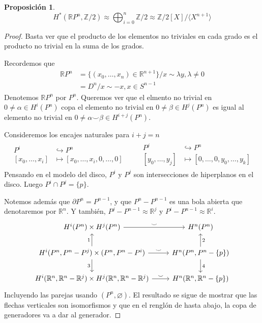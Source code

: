 \documentclass[spanish]{book}
\theoremstyle{definition}
\newtheorem*{prop}{Proposición}
\newcommand{\R}{\mathbb{R}}
\newcommand{\Z}{\mathbb{Z}}
\begin{document}
\begin{prop}
		\[H^*(\R P^n,\Z/2)\approx\bigoplus_{i=0}^n\Z/2\approx\Z/2[X]/\langle X^{n+1}\rangle\]
\end{prop}
\begin{proof}
	Basta ver que el producto de los elementos no triviales en cada grado es el producto no trivial en la suma de los grados.
	
	Recordemos que
	\begin{align*}
		\R P^n&=\{(x_0,\ldots,x_n)\in\R^{n+1}\}\Big/x\sim \lambda y,\lambda\neq0\\
		&=D^n\Big/x\sim -x, x\in S^{n-1}
	\end{align*}
	Denotemos $\R P^n$ por $P^n$. Queremos ver que el elmento no trivial en $0\neq\alpha\in H^i(P^n)$ copa el elemento no trivial en $0\neq\beta\in H^j(P^n)$ es igual al elemento no trivial en ${0\neq\alpha\smile\beta\in H^{i+j}(P^n)}$.
	
	Consideremos los encajes naturales para $i+j=n$
	\begin{align*}
		\begin{aligned}
			P^i&\hookrightarrow P^n\\
		[x_0,\ldots,x_i]&\mapsto[x_0,\ldots,x_i,0,\ldots,0]
		\end{aligned}\qquad
		\begin{aligned}
			P^j&\hookrightarrow P^n\\
			[y_0,\ldots,y_j]&\mapsto[0,\ldots,0,y_0,\ldots,y_k]
		\end{aligned}
	\end{align*}
	Pensando en el modelo del disco, $P^i$ y $P^j$ son intersecciones de hiperplanos en el disco. Luego $P^i\cap P^j=\{p\}$.
	
	Notemos además que $\partial P^n=P^{n-1}$, y que $P^n-P^{n-1}$ es una bola abierta que denotaremos por $\R^n$. Y también, $P^j-P^{n-1}\approx\R^j$ y $P^i-P^{n-1}\approx\R^i$.
	\[\begin{tikzcd}
		H^i(P^n)\times H^j(P^n)\arrow[r,"\smile"]&H^n(P^n)\\
		H^i(P^n,P^n-P^j)\times(P^n,P^n-P^i)\arrow[u,"1"]\arrow[r,"\smile"]\arrow[d,"3",swap]&H^n(P^n,P^n-\{p\})\arrow[u,"2",swap]\arrow[d,"4"]\\
		H^i(\R^n,\R^n-\R^j)\times H^j(\R^n,\R^n-\R^j)\arrow[r,"\smile"]&H^n(\R^n,\R^n-\{p\})
	\end{tikzcd}\]
	Incluyendo las parejas usando $(P^n,\varnothing)$. El resultado se sigue de mostrar que las flechas verticales son isomorfismos y que en el renglón de hasta abajo, la copa de generadores va a dar al generador.
	

\end{proof}
\end{document}

